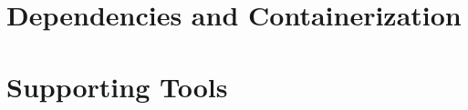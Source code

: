 
\section{Dependencies and Containerization}
\label{sec:Containerization}

\lipsum[1-3]

\section{Supporting Tools}
\label{sec:Tools}

\lipsum[1-3]